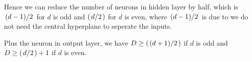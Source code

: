 \documentclass[12pt]{article}
\newcommand{\ParTh}[1]{\left(#1\right)}
\newcommand{\Divide}[2]{\left.#1\middle/#2\right.}
\begin{document}
Hence we can reduce the number of neurons in hidden layer by half, which is $\Divide{\ParTh{d-1}}{2}$ for $d$ is odd and $\ParTh{\Divide{d}{2}}$ for $d$ is even, where $\Divide{\ParTh{d-1}}{2}$ is due to we do not need the central hyperplane to seperate the inputs.

Plus the neuron in output layer, we have $D\geq \ParTh{\Divide{\ParTh{d+1}}{2}}$ if $d$ is odd and $D\geq \ParTh{\Divide{d}{2}}+1$ if $d$ is even.

\end{document}
